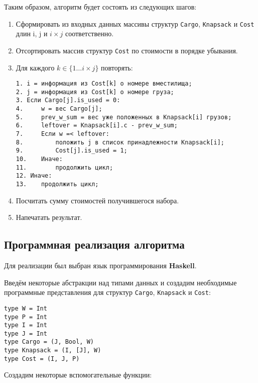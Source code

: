 \documentclass[14pt,a4paper]{extarticle}
\begin{document}
	Таким образом, алгоритм будет состоять из следующих шагов:
	\begin{enumerate}
		\item Сформировать из входных данных массивы структур \texttt{Cargo}, \texttt{Knapsack} и \texttt{Cost} длин i, j и $i \times j$ соответственно.
		\item Отсортировать массив структур \texttt{Cost} по стоимости в порядке убывания.
		\item Для каждого $k \in \{1\dots i \times j\}$ повторять:
		\begin{verbatim}
1. i = информация из Cost[k] о номере вместилища;
2. j = информация из Cost[k] о номере груза;
3. Если Cargo[j].is_used = 0:
4.     w = вес Cargo[j];
5.     prev_w_sum = вес уже положенных в Knapsack[i] грузов;
6.     leftover = Knapsack[i].c - prev_w_sum;
7.     Если w =< leftover:
8.         положить j в список принадлежности Knapsack[i];
9.         Cost[j].is_used = 1;
10.	   Иначе:
11.        продолжить цикл;
12. Иначе:
13.    продолжить цикл;
		\end{verbatim}
		
		\item Посчитать сумму стоимостей получившегося набора.
		
		\item Напечатать результат.
		
	\end{enumerate}

\subsection{Программная реализация алгоритма}

	Для реализации был выбран язык программирования \textbf{Haskell}.
	
	Введём некоторые абстракции над типами данных и создадим необходимые программные представления для структур \texttt{Cargo}, \texttt{Knapsack} и \texttt{Cost}:
	\lstset{language=haskell}
	\begin{lstlisting}
type W = Int
type P = Int
type I = Int
type J = Int
type Cargo = (J, Bool, W)
type Knapsack = (I, [J], W)
type Cost = (I, J, P)
	\end{lstlisting}
	
	Создадим некоторые вспомогательные функции:
	
\end{document}
